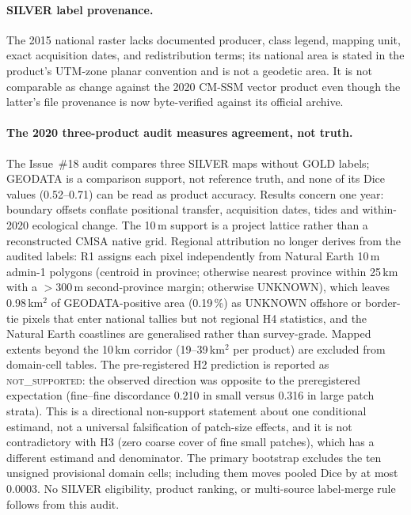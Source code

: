 \paragraph{SILVER label provenance.}
The 2015 national raster lacks documented producer, class legend,
mapping unit, exact acquisition dates, and redistribution terms; its
national area is stated in the product's UTM-zone planar convention
and is not a geodetic area. It is not comparable as change against the
2020 CM-SSM vector product even though the latter's file provenance is
now byte-verified against its official archive.

\paragraph{The 2020 three-product audit measures agreement, not truth.}
The Issue~\#18 audit compares three SILVER maps without GOLD labels;
GEODATA is a comparison support, not reference truth, and none of its
Dice values (0.52--0.71) can be read as product accuracy. Results
concern one year: boundary offsets conflate positional transfer,
acquisition dates, tides and within-2020 ecological change. The 10\,m
support is a project lattice rather than a reconstructed CMSA native
grid. Regional attribution no longer derives from the audited labels:
R1 assigns each pixel independently from Natural Earth 10\,m admin-1
polygons (centroid in province; otherwise nearest province within
25\,km with a $>$300\,m second-province margin; otherwise UNKNOWN),
which leaves 0.98\,km$^2$ of GEODATA-positive area (0.19\,\%) as
UNKNOWN offshore or border-tie pixels that enter national tallies but
not regional H4 statistics, and the Natural Earth coastlines are
generalised rather than survey-grade. Mapped extents beyond the 10\,km
corridor (19--39\,km$^2$ per product) are excluded from domain-cell
tables. The pre-registered H2 prediction is reported as
\textsc{not\_supported}: the observed direction was opposite to the
preregistered expectation (fine--fine discordance 0.210 in small
versus 0.316 in large patch strata). This is a directional non-support
statement about one conditional estimand, not a universal falsification
of patch-size effects, and it is not contradictory with H3 (zero coarse
cover of fine small patches), which has a different estimand and
denominator. The primary bootstrap excludes the ten unsigned
provisional domain cells; including them moves pooled Dice by at most
0.0003. No SILVER eligibility,
product ranking, or multi-source label-merge rule follows from this
audit.

